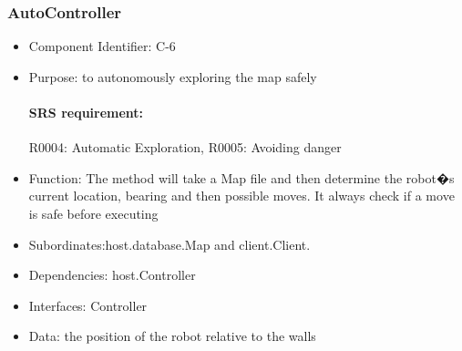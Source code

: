 \documentclass[11pt, a4paper]{report}
\begin{document}
\subsubsection{AutoController}
\begin{itemize}
\item Component Identifier: C-6
\item Purpose: to autonomously exploring the map safely
\paragraph{SRS requirement:} R0004: Automatic Exploration, R0005: Avoiding danger
\item Function: The method will take a Map file and then determine the robot�s current location, bearing and then possible moves. 
It always check if a move is safe before  executing 
\item Subordinates:host.database.Map and client.Client.
\item Dependencies: host.Controller
\item Interfaces: Controller
\item Data: the position of the robot relative to the walls
\end{itemize}
\end{document}
